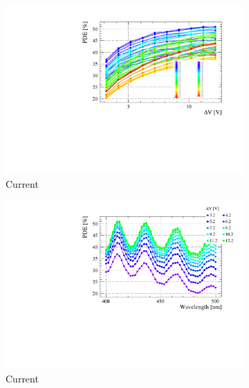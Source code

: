 \begin{landscape}
\begin{figure}[htbp]
    \centering
    \begin{subfigure}{0.65\textwidth}
        \includegraphics[width=\linewidth]{gfx/plots/PDE/31/c_Current_Bias.pdf}  
        \caption{Current}
    \end{subfigure}
    \begin{subfigure}{0.65\textwidth}
        \includegraphics[width=\linewidth]{gfx/plots/PDE/31/c_Current_Wavelength.pdf}  
        \caption{Current}
    \end{subfigure}
    \\
    \begin{subfigure}{0.65\textwidth}

\end{subfigure}
\end{figure}
\end{landscape}
